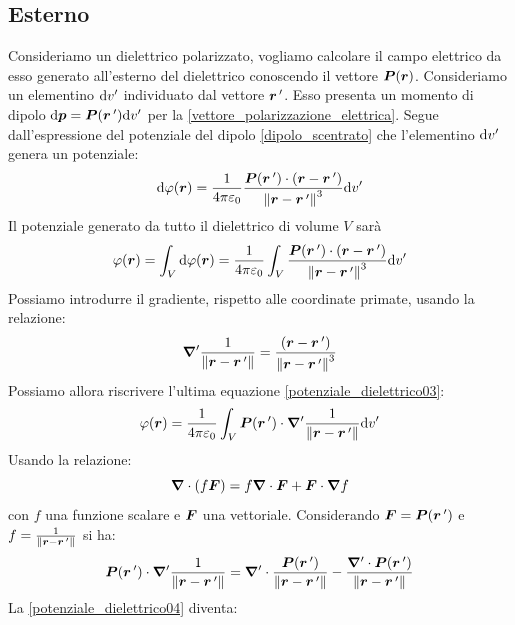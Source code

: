 \subsection{Esterno}
Consideriamo un dielettrico polarizzato, vogliamo calcolare il campo elettrico da esso generato all'esterno del dielettrico conoscendo il vettore $\boldsymbol{P}(\boldsymbol{r})$. Consideriamo un elementino $\mathrm{d} v'$ individuato dal vettore $\boldsymbol{r}\,'$. Esso presenta un momento di dipolo $\mathrm{d}\boldsymbol{p}=\boldsymbol{P}(\boldsymbol{r}\,')\mathrm{d} v'$ per la \eqref{vettore_polarizzazione_elettrica}. Segue dall'espressione del potenziale del dipolo \eqref{dipolo_scentrato} che l'elementino $\mathrm{d} v'$ genera un potenziale:
\begin{equation}
  \mathrm{d}\varphi(\boldsymbol{r})=\frac{1}{4\pi\varepsilon_0}\frac{\boldsymbol{P}(\boldsymbol{r}\,')\cdot\left(\boldsymbol{r}-\boldsymbol{r}\,'\right)}{\left\lVert\boldsymbol{r}-\boldsymbol{r}\,'\right\rVert^3}\mathrm{d} v'
\end{equation}
Il potenziale generato da tutto il dielettrico di volume $V$ sarà
\begin{equation}
  \varphi(\boldsymbol{r})=\int_V\mathrm{d}\varphi(\boldsymbol{r})=\frac{1}{4\pi\varepsilon_0}\int_V\frac{\boldsymbol{P}(\boldsymbol{r}\,')\cdot\left(\boldsymbol{r}-\boldsymbol{r}\,'\right)}{\left\lVert\boldsymbol{r}-\boldsymbol{r}\,'\right\rVert^3}\mathrm{d} v'
  \label{potenziale_dielettrico03}
\end{equation}
Possiamo introdurre il gradiente, rispetto alle coordinate primate, usando la relazione:
\begin{equation}
  \boldsymbol{\nabla}'\frac{1}{\left\lVert\boldsymbol{r}-\boldsymbol{r}\,'\right\rVert}=\frac{\left(\boldsymbol{r}-\boldsymbol{r}\,'\right)}{\left\lVert\boldsymbol{r}-\boldsymbol{r}\,'\right\rVert^3}
\end{equation}
Possiamo allora riscrivere l'ultima equazione \eqref{potenziale_dielettrico03}:
\begin{equation}
  \varphi(\boldsymbol{r})=\frac{1}{4\pi\varepsilon_0}\int_V\boldsymbol{P}(\boldsymbol{r}\,')\cdot\boldsymbol{\nabla}'\frac{1}{\left\lVert\boldsymbol{r}-\boldsymbol{r}\,'\right\rVert}\mathrm{d} v'
  \label{potenziale_dielettrico04}
\end{equation}
Usando la relazione:
\begin{equation}
  \boldsymbol{\nabla}\cdot(f\boldsymbol{F})=f\boldsymbol{\nabla}\cdot\boldsymbol{F}+\boldsymbol{F}\cdot\boldsymbol{\nabla} f
\end{equation}
con $f$ una funzione scalare e $\boldsymbol{F}$ una vettoriale. Considerando $\boldsymbol{F}=\boldsymbol{P}(\boldsymbol{r}\,')$ e $f=\frac{1}{\left\lVert\boldsymbol{r}-\boldsymbol{r}\,'\right\rVert}$ si ha:
\begin{equation}
  \boldsymbol{P}(\boldsymbol{r}\,')\cdot\boldsymbol{\nabla}'\frac{1}{\left\lVert\boldsymbol{r}-\boldsymbol{r}\,'\right\rVert}=\boldsymbol{\nabla}'\cdot\frac{\boldsymbol{P}(\boldsymbol{r}\,')}{\left\lVert\boldsymbol{r}-\boldsymbol{r}\,'\right\rVert}-\frac{\boldsymbol{\nabla}'\cdot\boldsymbol{P}(\boldsymbol{r}\,')}{\left\lVert\boldsymbol{r}-\boldsymbol{r}\,'\right\rVert}
\end{equation}
La \eqref{potenziale_dielettrico04} diventa:
